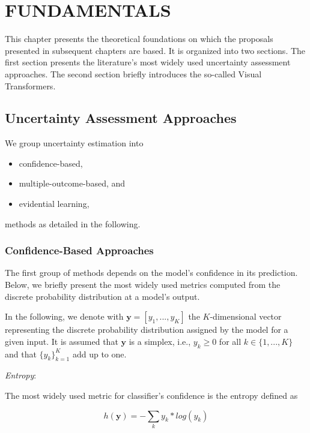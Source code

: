 \chapter{FUNDAMENTALS}\label{sect:Fundamentals}
This chapter presents the theoretical foundations on which the proposals presented in subsequent chapters are based. It is organized into two sections.
The first section presents the literature's most widely used uncertainty assessment approaches. The second section briefly introduces the so-called Visual Transformers.

\section{Uncertainty Assessment Approaches}

We group uncertainty estimation into 
\begin{itemize}
    \item confidence-based, 
    \item multiple-outcome-based, and
    \item evidential learning,
\end{itemize}
\noindent 
methods as detailed in the following.

\subsection{Confidence-Based Approaches}

The first group of methods depends on the model's confidence in its prediction. Below, we briefly present the most widely used metrics computed from the discrete probability distribution at a model's output.

In the following, we denote with $\textbf{y}=[ y_1,..., y_K]$ the $K$-dimensional vector representing the discrete probability distribution assigned by the model for a given input. It is assumed that $\textbf{y}$ is a simplex, i.e., $y_k \geq 0$ for all $k \in \{1,...,K\}$ and that $\{y_k\}_{k=1}^K$ add up to one.

\bigskip
\noindent
\textit{Entropy}:%

The most widely used metric for classifier's confidence is the entropy defined as

\begin{equation} \label{eq:Entropy}
h(\textbf{y}) = - \sum_{k} y_k*log (y_k)
\end{equation}

